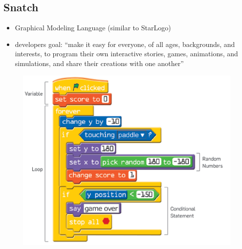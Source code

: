 \documentclass[runningheads,a4paper]{llncs}
\begin{document}

   \subsection{Snatch}

  \begin{itemize}
  \item Graphical Modeling Language (similar to StarLogo)
  \item developers goal: ``make it easy for everyone,
of all ages, backgrounds, and interests, to program
their own interactive stories, games, animations, and
simulations, and share their creations with one another''
  \end{itemize}
    \begin{figure}[H]
      \centering
      \includegraphics[width=\textwidth]{images/Snatch1.PNG}
    \end{figure}
  
\end{document}
